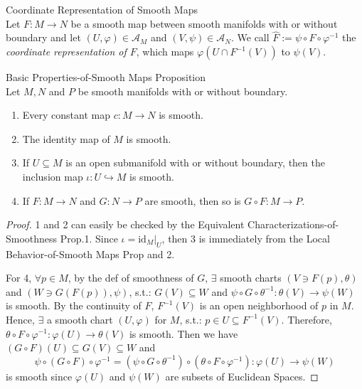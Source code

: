 \begin{definition}{Coordinate Representation of Smooth Maps}\\
Let $F:M\to N$ be a smooth map between smooth manifolds with or without boundary and let $(U,\varphi) \in \mathcal{A}_M$ and $(V,\psi)\in \mathcal{A}_N$. We call $\widehat{F}:= \psi \circ F\circ \varphi^{-1}$ the \textit{coordinate representation of $F$}, which maps $\varphi(U \cap F^{-1}(V))$ to $\psi(V)$.
\end{definition}

\begin{proposition}{Basic Properties-of-Smooth Maps Proposition}\\
Let $M,N$ and $P$ be smooth manifolds with or without boundary.
\begin{enumerate}
    \item Every constant map $c:M\to N$ is smooth.
    \item The identity map of $M$ is smooth.
    \item If $U\subseteq M$ is an open submanifold with or without boundary, then the inclusion map $\iota:U \hookrightarrow M$ is smooth.
    \item If $F:M\to N$ and $G:N\to P$ are smooth, then so is $G\circ F:M\to P$.
\end{enumerate}
\end{proposition}

\begin{proof}
    1 and 2 can easily be checked by the Equivalent Characterizations-of-Smoothness Prop.1. Since $\iota= \text{id}_M|_U$, then 3 is immediately from the Local Behavior-of-Smooth Maps Prop and 2.

    For 4, $\forall p\in M$, by the def of smoothness of $G$, $\exists$ smooth charts $(V \ni F(p), \theta)$ and $(W\ni G(F(p)), \psi)$, s.t.: $G(V) \subseteq W$ and $\psi \circ G\circ \theta^{-1}:\theta (V) \to \psi(W)$ is smooth. By the continuity of $F$, $F^{-1}(V)$ is an open neighborhood of $p$ in $M$. Hence, $\exists$ a smooth chart $(U,\varphi)$ for $M$, s.t.: $p\in U\subseteq F^{-1} (V)$. Therefore, $\theta \circ F\circ \varphi^{-1}: \varphi (U) \to \theta (V)$ is smooth. Then we have $(G\circ F) (U) \subseteq G(V) \subseteq W$ and
    \[
    \psi\circ (G\circ F) \circ \varphi^{-1}= (\psi \circ G\circ \theta^{-1}) \circ (\theta \circ F\circ \varphi^{-1}) :\varphi (U) \to \psi(W)
    \]
    is smooth since $\varphi(U)$ and $\psi(W)$ are subsets of Euclidean Spaces.
\end{proof}


